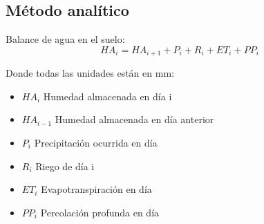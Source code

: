 \subsection{Método analítico}

Balance de agua en el suelo:
\begin{equation}
    HA_i = HA_{i + 1} + P_i + R_i + ET_i + PP_i
\end{equation}
\begin{notation}Donde todas las unidades están en mm:
    \begin{itemize} 
        \item $HA_i$ Humedad almacenada en día i
        \item $HA_{i-1}$ Humedad almacenada en día anterior
        \item $P_i$ Precipitación ocurrida en día 
        \item $R_i$ Riego de día i
        \item $ET_i$ Evapotranspiración en día
        \item $PP_i$ Percolación profunda en día
    \end{itemize}
\end{notation}








